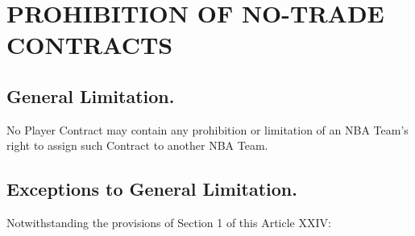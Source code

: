 \documentclass[
]{book}
\begin{document}
\hypertarget{prohibition-of-no-trade-contracts}{%
\chapter{PROHIBITION OF NO-TRADE CONTRACTS}\label{prohibition-of-no-trade-contracts}}

\hypertarget{general-limitation.}{%
\section{General Limitation.}\label{general-limitation.}}

No Player Contract may contain any prohibition or limitation of an NBA Team's right to assign such Contract to another NBA Team.

\hypertarget{exceptions-to-general-limitation.}{%
\section{Exceptions to General Limitation.}\label{exceptions-to-general-limitation.}}

Notwithstanding the provisions of Section 1 of this Article XXIV:
\end{document}
